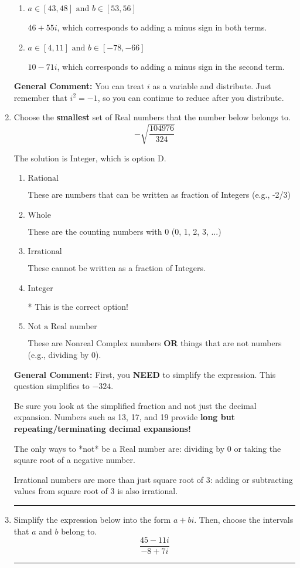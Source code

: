 \documentclass{extbook}[14pt]
\newcommand{\litem}[1]{\item #1

\rule{\textwidth}{0.4pt}}
\begin{document}
\begin{enumerate}
{\begin{enumerate}[label=\Alph*.]
* $46 - 55 i$, which is the correct option.
\item \( a \in [43, 48] \text{ and } b \in [53, 56] \)

 $46 + 55 i$, which corresponds to adding a minus sign in both terms.
\item \( a \in [4, 11] \text{ and } b \in [-78, -66] \)

 $10 - 71 i$, which corresponds to adding a minus sign in the second term.
\end{enumerate}

\textbf{General Comment:} You can treat $i$ as a variable and distribute. Just remember that $i^2=-1$, so you can continue to reduce after you distribute.
}
\litem{
Choose the \textbf{smallest} set of Real numbers that the number below belongs to.
\[ -\sqrt{\frac{104976}{324}} \]

The solution is \( \text{Integer} \), which is option D.\begin{enumerate}[label=\Alph*.]
\item \( \text{Rational} \)

These are numbers that can be written as fraction of Integers (e.g., -2/3)
\item \( \text{Whole} \)

These are the counting numbers with 0 (0, 1, 2, 3, ...)
\item \( \text{Irrational} \)

These cannot be written as a fraction of Integers.
\item \( \text{Integer} \)

* This is the correct option!
\item \( \text{Not a Real number} \)

These are Nonreal Complex numbers \textbf{OR} things that are not numbers (e.g., dividing by 0).
\end{enumerate}

\textbf{General Comment:} First, you \textbf{NEED} to simplify the expression. This question simplifies to $-324$. 
 
 Be sure you look at the simplified fraction and not just the decimal expansion. Numbers such as 13, 17, and 19 provide \textbf{long but repeating/terminating decimal expansions!} 
 
 The only ways to *not* be a Real number are: dividing by 0 or taking the square root of a negative number. 
 
 Irrational numbers are more than just square root of 3: adding or subtracting values from square root of 3 is also irrational.
}
\litem{
Simplify the expression below into the form $a+bi$. Then, choose the intervals that $a$ and $b$ belong to.
\[ \frac{45 - 11 i}{-8 + 7 i} \]

}
\end{enumerate}
\end{document}
